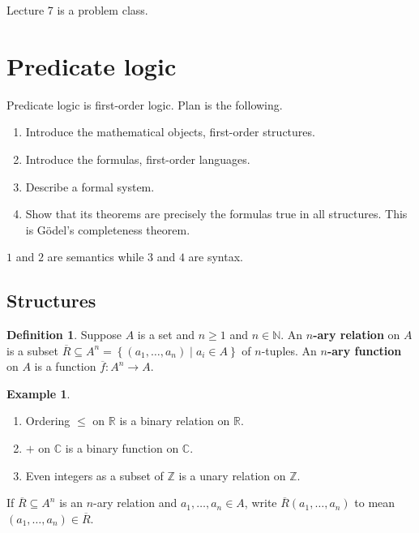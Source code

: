 \documentclass{article}
\newcommand{\N}{\mathbb{N}}
\newcommand{\Z}{\mathbb{Z}}
\newcommand{\R}{\mathbb{R}}
\newcommand{\C}{\mathbb{C}}
\newcommand{\rb}[1]{\left( #1 \right)}
\newcommand{\cb}[1]{\left\{ #1 \right\}}
\theoremstyle{definition}\newtheorem{definition}{Definition}[subsection]
\theoremstyle{definition}\newtheorem{remark}[definition]{Remark}
\theoremstyle{definition}\newtheorem*{example}{Example}
\theoremstyle{definition}\newtheorem*{note}{Note}
\begin{document}
Lecture 7 is a problem class.


\section{Predicate logic}

Predicate logic is first-order logic. Plan is the following.
\begin{enumerate}
\item Introduce the mathematical objects, first-order structures.
\item Introduce the formulas, first-order languages.
\item Describe a formal system.
\item Show that its theorems are precisely the formulas true in all structures. This is Gödel's completeness theorem.
\end{enumerate}
$ 1 $ and $ 2 $ are semantics while $ 3 $ and $ 4 $ are syntax.

\subsection{Structures}

\begin{definition}
Suppose $ A $ is a set and $ n \ge 1 $ and $ n \in \N $. An \textbf{$ n $-ary relation} on $ A $ is a subset $ \overline{R} \subseteq A^n = \cb{\rb{a_1, \dots, a_n} \mid a_i \in A} $ of $ n $-tuples. An \textbf{$ n $-ary function} on $ A $ is a function $ \overline{f} : A^n \to A $.
\end{definition}

\begin{example}
\hfill
\begin{enumerate}
\item Ordering $ \le $ on $ \R $ is a binary relation on $ \R $.
\item $ + $ on $ \C $ is a binary function on $ \C $.
\item Even integers as a subset of $ \Z $ is a unary relation on $ \Z $.
\end{enumerate}
\end{example}

If $ \overline{R} \subseteq A^n $ is an $ n $-ary relation and $ a_1, \dots, a_n \in A $, write $ \overline{R}\rb{a_1, \dots, a_n} $ to mean $ \rb{a_1, \dots, a_n} \in \overline{R} $.
\end{document}
